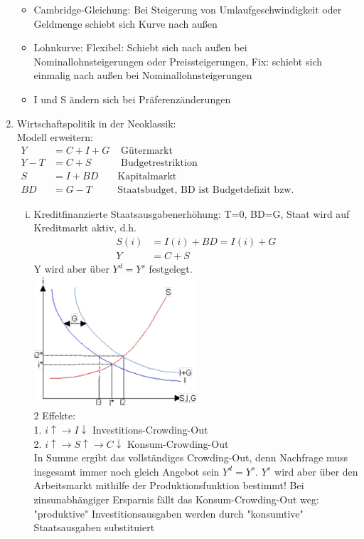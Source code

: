 \documentclass{scrartcl}
\begin{document}
\begin{enumerate}
\begin{itemize}
  \item Cambridge-Gleichung: Bei Steigerung von Umlaufgeschwindigkeit oder Geldmenge schiebt sich Kurve nach au{\ss}en
  \item Lohnkurve: Flexibel: Schiebt sich nach au{\ss}en bei Nominallohnsteigerungen oder Preissteigerungen, Fix: schiebt sich einmalig nach au{\ss}en bei Nominallohnsteigerungen
  \item I und S \"{a}ndern sich bei Pr\"{a}ferenz\"{a}nderungen
\end{itemize}
\item Wirtschaftspolitik in der Neoklassik:\\
Modell erweitern:
\begin{align*}
Y &= C+I+G &\text{ G\"{u}termarkt}\\
Y - T &= C+S &\text{ Budgetrestriktion}\\
S &= I + BD	&\text{Kapitalmarkt}\\
BD &= G-T &\text{Staatsbudget, BD ist Budgetdefizit bzw. Neuverschuldung}
\end{align*}
\begin{enumerate}[(i)]
\item Kreditfinanzierte Staatsausgabenerh\"{o}hung: T=0, BD=G, Staat wird auf Kreditmarkt aktiv, d.h.
\begin{align*}
S(i)&=I(i)+BD =I(i)+G\\
Y &= C+S
\end{align*}
Y wird aber \"{u}ber $Y^d=Y^s$ festgelegt.\\
\includegraphics[width=0.5\textwidth]{Bilder/Klassik_Crowding_Out.pdf}\\
2 Effekte:\\
1. $i\uparrow \rightarrow I \downarrow$ Investitions-Crowding-Out\\
2. $i\uparrow \rightarrow S \uparrow \rightarrow C \downarrow$ Konsum-Crowding-Out\\
In Summe ergibt das vollst\"{a}ndiges Crowding-Out, denn Nachfrage muss insgesamt immer noch gleich Angebot sein $Y^d=Y^s$. $Y^s$ wird aber \"{u}ber den Arbeitsmarkt mithilfe der Produktionsfunktion bestimmt! Bei zinsunabh\"{a}ngiger Ersparnis f\"{a}llt das Konsum-Crowding-Out weg: "produktive" Investitionsausgaben werden durch "konsumtive" Staatsausgaben substituiert


\end{enumerate}
\end{enumerate}
\end{document}
